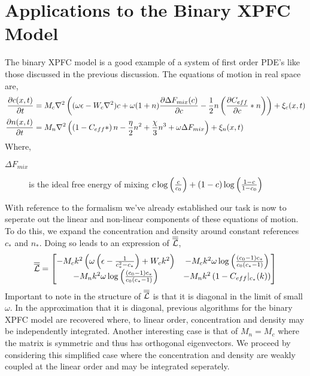 \section{Applications to the Binary XPFC Model} %

The binary XPFC model is a good example of a system of first order PDE's like
those discussed in the previous discussion. The equations of motion in real
space are, 
%
\begin{align}
	\frac{\partial c(x, t)}{\partial t} 
		&= M_c \nabla^2 \left( (\omega\epsilon - W_c\nabla^2) c 
			+ \omega (1 + n) \frac{\partial \Delta F_{mix}(c)}{\partial c} 
			- \frac{1}{2} n \left(\frac{\partial C_{eff}}{\partial c} \ast n\right)
		\right) + \xi_c(x, t) \\
	\frac{\partial n(x,t)}{\partial t} &= M_n \nabla^2 \left(
		\left(1 - C_{eff} \ast \right) n	- \frac{\eta}{2} n^2 + \frac{\chi}{3}n^3 + \omega\Delta F_{mix}
	 \right)  + \xi_n(x, t)
\end{align}
%
Where,
\begin{description}
    \item[$\Delta F_{mix}$] is the ideal free energy of mixing 
        $c\log\left(\frac{c}{c_0}\right) + (1-c)\log\left(\frac{1-c}{1-c_0}\right)$
\end{description}
%
With reference to the formalism we've already established our task is now to
seperate out the linear and non-linear components of these equations of motion.
To do this, we expand the concentration and density around constant references
$c_\ast$ and $n_\ast$. Doing so leads to an expression of $\overline{\overline{\mathcal{L}}}$, 
%
\begin{equation}
	\overline{\overline{\mathcal{L}}} =
    \begin{bmatrix}
	- M_c k^2 \left( \omega\left(\epsilon - \frac{1}{c_\ast^2 - c_\ast}\right) + W_c k^2\right) & 
    - M_c k^2 \omega \log\left(\frac{(c_0-1)c_\ast}{c_0(c_\ast-1)}\right) \\
	- M_n k^2 \omega \log \left(\frac{(c_0-1)c_\ast}{c_0(c_\ast-1)}\right) &
    - M_n k^2 \left( 1-C_{eff}\vert_{c_\ast}(k) \right)
	\end{bmatrix}
\end{equation}
%
Important to note in the structure of $\overline{\overline{\mathcal{L}}}$ is that it is diagonal
in the limit of small $\omega$. In the approximation that it is diagonal,
previous algorithms for the binary XPFC model are recovered where, to linear
order, concentration and density may be independently integrated. Another
interesting case is that of $M_n = M_c$ where the matrix is symmetric and thus
has orthogonal eigenvectors. We proceed by considering this simplified case
where the concentration and density are weakly coupled at the linear order and
may be integrated seperately.


